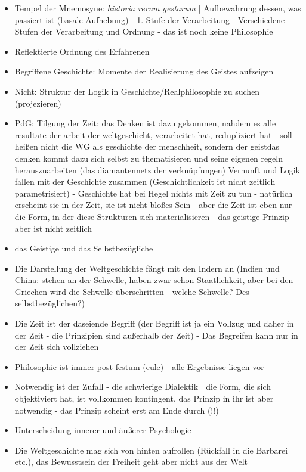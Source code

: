\documentclass[emulatestandardclasses]{scrartcl}
\begin{document}
\begin{itemize}
  \item Tempel der Mnemosyne: \emph{historia rerum gestarum} | Aufbewahrung dessen, was passiert ist (basale Aufhebung) - 1. Stufe der Verarbeitung - Verschiedene Stufen der Verarbeitung und Ordnung - das ist noch keine Philosophie
  \item Reflektierte Ordnung des Erfahrenen
  \item Begriffene Geschichte: Momente der Realisierung des Geistes aufzeigen
  \item Nicht: Struktur der Logik in Geschichte/Realphilosophie zu suchen (projezieren)
  \item PdG: Tilgung der Zeit: das Denken ist dazu gekommen, nahdem es alle resultate der arbeit der weltgeschicht, verarbeitet hat, redupliziert hat - soll heißen nicht die WG als geschichte der menschheit, sondern der geistdas denken  kommt dazu sich selbst zu thematisieren und seine eigenen regeln herauszuarbeiten (das diamantennetz der verknüpfungen) Vernunft und Logik fallen mit der Geschichte zusammen (Geschichtlichkeit ist nicht zeitlich parametrisiert) - Geschichte hat bei Hegel nichts mit Zeit zu tun - natürlich erscheint sie in der Zeit, sie ist nicht bloßes Sein - aber die Zeit ist eben nur die Form, in der diese Strukturen sich materialisieren - das geistige Prinzip aber ist nicht zeitlich
  \item das Geistige und das Selbstbezügliche
  \item Die Darstellung der Weltgeschichte fängt mit den Indern an (Indien und China: stehen an der Schwelle, haben zwar schon Staatlichkeit, aber bei den Griechen wird die Schwelle überschritten - welche Schwelle? Des selbstbezüglichen?)
  \item Die Zeit ist der daseiende Begriff (der Begriff ist ja ein Vollzug und daher in der Zeit - die Prinzipien sind außerhalb der Zeit) - Das Begreifen kann nur in der Zeit sich vollziehen
  \item Philosophie ist immer post festum (eule) - alle Ergebnisse liegen vor
  \item Notwendig ist der Zufall - die schwierige Dialektik | die Form, die sich objektiviert hat, ist vollkommen kontingent, das Prinzip in ihr ist aber notwendig - das Prinzip scheint erst am Ende durch (!!)
  \item Unterscheidung innerer und äußerer Psychologie
  \item Die Weltgeschichte mag sich von hinten aufrollen (Rückfall in die Barbarei etc.), das Bewusstsein der Freiheit geht aber nicht aus der Welt

\end{itemize}
\end{document}
